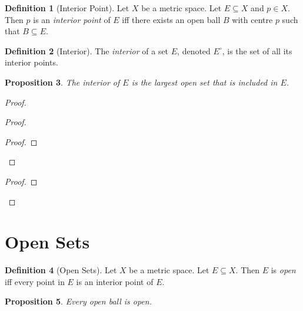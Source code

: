 \documentclass{book}
\let\qed\relax
\newtheorem{prop}{Proposition}[chapter]
\theoremstyle{definition}
\newtheorem{df}[prop]{Definition}
\begin{document}
\begin{df}[Interior Point]
Let $X$ be a metric space. Let $E \subseteq X$ and $p \in X$. Then $p$ is an \emph{interior point} of $E$ iff there exists an open ball $B$ with centre $p$ such that $B \subseteq E$.
\end{df}

\begin{df}[Interior]
The \emph{interior} of a set $E$, denoted $E^\circ$, is the set of all its interior points.
\end{df}

\begin{prop}
The interior of $E$ is the largest open set that is included in $E$.
\end{prop}

\begin{proof}
\pf
{}
\begin{proof}
	\begin{proof}
	\end{proof}
\end{proof}
\begin{proof}
\end{proof}
\qed
\end{proof}

\section{Open Sets}

\begin{df}[Open Sets]
Let $X$ be a metric space. Let $E \subseteq X$. Then $E$ is \emph{open} iff every point in $E$ is an interior point of $E$.
\end{df}

\begin{prop}
Every open ball is open.
\end{prop}
\end{document}
